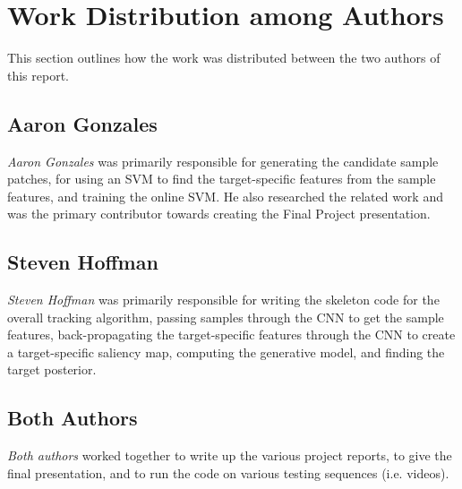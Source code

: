 \documentclass{sig-alternate-05-2015}
\begin{document}
\section{Work Distribution among Authors}
This section outlines how the work was distributed between the two authors of this report. 

\subsection{Aaron Gonzales}
\textit{Aaron Gonzales} was primarily responsible for generating the candidate sample patches, for using an SVM to find the target-specific features from the sample features, and training the online SVM.
He also researched the related work and was the primary contributor towards creating the Final Project presentation.

\subsection{Steven Hoffman}
\textit{Steven Hoffman} was primarily responsible for writing the skeleton code for the overall tracking algorithm, passing samples through the CNN to get the sample features, back-propagating the target-specific features through the CNN to create a target-specific saliency map, computing the generative model, and finding the target posterior.

\subsection{Both Authors}
\textit{Both authors} worked together to write up the various project reports, to give the final presentation, and to run the code on various testing sequences (i.e. videos).



\end{document}
